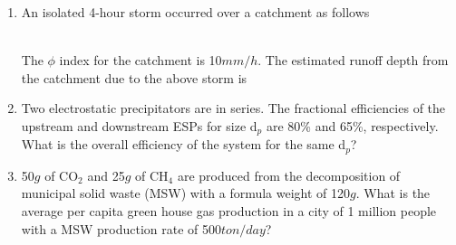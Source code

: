 \documentclass[journal,12pt,onecolumn]{IEEEtran}
\theoremstyle{remark}
\begin{document}
\begin{enumerate}
\begin{enumerate}
\end{enumerate}
\item An isolated 4-hour storm occurred over a catchment as follows\\
\begin{table}[h]
    \centering
    
\end{table}\\
The $\phi$ index for the catchment is 10$mm/h$. The estimated runoff depth from the catchment due to the above storm is
\begin{enumerate}
\end{enumerate}
\item Two electrostatic precipitators  are in series. The fractional efficiencies of the upstream and downstream ESPs for size d$_p$ are 80\% and 65\%, respectively. What is the overall efficiency of the system for the same d$_p$?
\begin{enumerate}
\end{enumerate}
\item 50$g$ of CO$_2$ and 25$g$ of CH$_4$ are produced from the decomposition of municipal solid waste (MSW) with a formula weight of 120$g$. What is the average per capita green house gas production in a city of 1 million people with a MSW production rate of 500$ton/day$?
\begin{enumerate}
\end{enumerate}
\end{enumerate}
\end{document}
